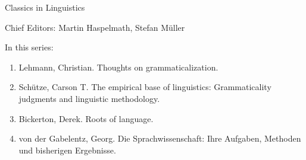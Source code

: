 {\large Classics in Linguistics}

\bigskip

Chief Editors: Martin Haspelmath, Stefan Müller

\bigskip

In this series:

\begin{enumerate}
\item Lehmann, Christian. Thoughts on grammaticalization.
\item Schütze, Carson T. The empirical base of linguistics: Grammaticality judgments and linguistic methodology.
\item Bickerton, Derek. Roots of language.
\item von der Gabelentz, Georg. Die Sprachwissenschaft:  Ihre Aufgaben, Methoden und bisherigen Ergebnisse. 
\end{enumerate}


\vfill

